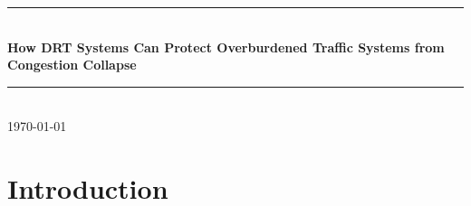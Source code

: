 \documentclass[a4paper]{article}
\begin{document}
\begin{titlepage}

\newcommand{\HRule}{\rule{\linewidth}{0.5mm}} 							%
\center 
 

\HRule \\[0.8cm]
{ \huge \bfseries How DRT Systems Can Protect Overburdened Traffic Systems from Congestion Collapse}\\[0.7cm]								%
\HRule \\[2cm]
\large
{\large \today}\\[5cm]
\vfill 
\end{titlepage}

\begin{abstract}

This article addresses issues of transport system design through simulation of  demand responsive transport systems and its impact on relieving  congestion in the context of a developing city, Cape Town, South Africa. Cape Town is struggling with high levels of congestion, which we hypothesize can be addressed through demand responsive transport as an emerging technology. The results of our simulation study, which introduces demand responsive transport options, shows a reduction in congestion, whilst otherwise also providing a socially desirable solution. The findings can be harnessed in other settings like Cape Town for pushing forward transport system design for economic and social improvement. Furthermore, the usefulness of simulation with an Agent-Based model such as MATsim proves to provide a useful application for research and policy advice.


\end{abstract}

\section*{Introduction}
\end{document}
